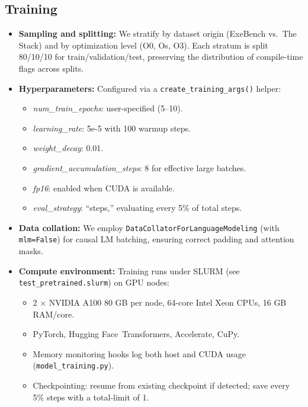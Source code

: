 \documentclass[../main.tex]{subfiles}
\begin{document}
\subsection{Training}

\begin{itemize}
  \item \textbf{Sampling and splitting:}  
    We stratify by dataset origin (ExeBench vs.\ The Stack) and by optimization level (O0, Os, O3). Each stratum is split 80/10/10 for train/validation/test, preserving the distribution of compile-time flags across splits.

  \item \textbf{Hyperparameters:}  
    Configured via a \texttt{create\_training\_args()} helper:
    \begin{itemize}
      \item \emph{num\_train\_epochs}: user-specified (5–10).  
      \item \emph{learning\_rate}: 5e-5 with 100 warmup steps.  
      \item \emph{weight\_decay}: 0.01.  
      \item \emph{gradient\_accumulation\_steps}: 8 for effective large batches.  
      \item \emph{fp16}: enabled when CUDA is available.  
      \item \emph{eval\_strategy}: “steps,” evaluating every 5\% of total steps.  
    \end{itemize}

  \item \textbf{Data collation:}  
    We employ \texttt{DataCollatorForLanguageModeling} (with \texttt{mlm=False}) for causal LM batching, ensuring correct padding and attention masks.

  \item \textbf{Compute environment:}  
    Training runs under SLURM (see \texttt{test\_pretrained.slurm}) on GPU nodes:
    \begin{itemize}
      \item 2 × NVIDIA A100 80 GB per node, 64-core Intel Xeon CPUs, 16 GB RAM/core.  
      \item PyTorch, Hugging Face Transformers, Accelerate, CuPy.  
      \item Memory monitoring hooks log both host and CUDA usage (\texttt{model\_training.py}).  
      \item Checkpointing: resume from existing checkpoint if detected; save every 5\% steps with a total‐limit of 1.
    \end{itemize}


\end{itemize}
\end{document}
